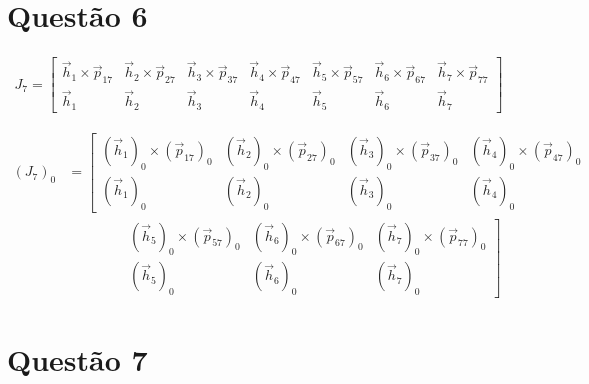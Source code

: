 \documentclass[a4paper,11pt]{article}
\theoremstyle{mytheor}
\begin{document}
\section*{Questão 6}

\begin{gather*}
J_7 = \begin{bmatrix} 
\vec{h}_1 \times \vec{p}_{17} & \vec{h}_2 \times \vec{p}_{27} & \vec{h}_3 \times \vec{p}_{37} & \vec{h}_4 \times \vec{p}_{47} & \vec{h}_5 \times \vec{p}_{57} & \vec{h}_6 \times \vec{p}_{67} & \vec{h}_7 \times \vec{p}_{77} \\
\vec{h}_1 & \vec{h}_2 & \vec{h}_3 & \vec{h}_4 & \vec{h}_5 & \vec{h}_6 & \vec{h}_7 \end{bmatrix}
\end{gather*}

\begin{equation*}
\begin{aligned}
(J_7)_0 &= 
\left[\begin{matrix} 
(\vec{h}_1)_0 \times (\vec{p}_{17})_0 & (\vec{h}_2)_0 \times (\vec{p}_{27})_0 & (\vec{h}_3)_0 \times (\vec{p}_{37})_0 & (\vec{h}_4)_0 \times (\vec{p}_{47})_0 \\
(\vec{h}_1)_0 & (\vec{h}_2)_0 & (\vec{h}_3)_0 & (\vec{h}_4)_0
\end{matrix}\right. \\
&\qquad\qquad
\left.\begin{matrix}
(\vec{h}_5)_0 \times (\vec{p}_{57})_0 & (\vec{h}_6)_0 \times (\vec{p}_{67})_0 & (\vec{h}_7)_0 \times (\vec{p}_{77})_0 \\
(\vec{h}_5)_0 & (\vec{h}_6)_0 & (\vec{h}_7)_0
\end{matrix}\right]
\end{aligned}
\end{equation*}


\section*{Questão 7}
\end{document}
